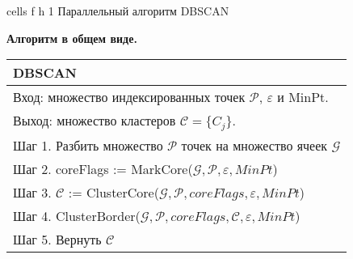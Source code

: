 {cells} %
{f} %
{h} %
{1\textwidth} %
{Параллельный алгоритм DBSCAN} %

\clearpage

\textbf{Алгоритм в общем виде.}
\begin{table}[h!]
        \begin{threeparttable}
            \captionsetup{justification=raggedleft,singlelinecheck=off}
            \begin{tabular}{p{16cm}}
                \hline
                DBSCAN \\
                \hline
                Вход: множество индексированных точек \(\mathcal{P}\), \(\varepsilon\) и MinPt. \\
                Выход: множество кластеров \(\mathcal{C} = \{C_j\}\).\\
                Шаг 1. Разбить множество \(\mathcal{P}\) точек на множество ячеек \(\mathcal{G}\)\\
                Шаг 2. coreFlags := MarkCore(\(\mathcal{G}, \mathcal{P}, \varepsilon, MinPt\))\\
                Шаг 3. \(\mathcal{C}\) := ClusterCore(\(\mathcal{G}, \mathcal{P}, coreFlags, \varepsilon, MinPt\))\\
                Шаг 4. ClusterBorder(\(\mathcal{G}, \mathcal{P}, coreFlags, \mathcal{C}, \varepsilon, MinPt\))\\
                Шаг 5. Вернуть \(\mathcal{C}\) \\
                \hline
            \end{tabular}
        \end{threeparttable}
\end{table}

